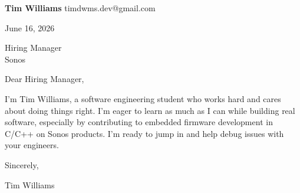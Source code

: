 \documentclass[12pt]{article}
\begin{document}
\textbf{Tim Williams} \hfill timdwms.dev@gmail.com

\vspace{1em}

June 16, 2026

\vspace{1em}

Hiring Manager \\
Sonos

\vspace{1em}

Dear Hiring Manager,

I'm Tim Williams, a software engineering student who works hard and cares about doing things right. I'm eager to learn as much as I can while building real software, especially by contributing to embedded firmware development in C/C++ on Sonos products. I'm ready to jump in and help debug issues with your engineers.

\vspace{1em}

Sincerely,

\vspace{2em}

Tim Williams
\end{document}
